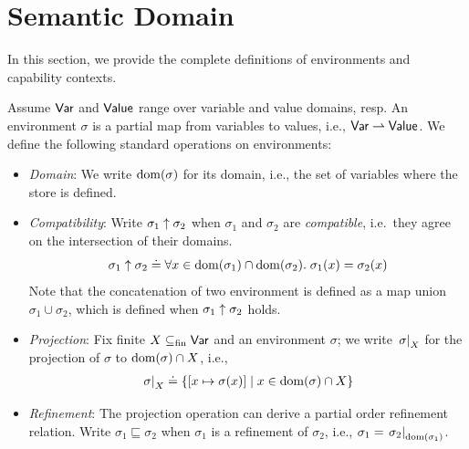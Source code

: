 \newpage
\section{Semantic Domain}%
\label{sec:formalization-details}

In this section, we provide the complete definitions of environments
and capability contexts.

\begin{definition}[Environment]\label{def:env}
  Assume $\mathsf{Var}$ and $\mathsf{Value}$ range over variable and value domains,
  resp. An environment $\sigma$ is a partial map from variables to
  values, i.e., $\mathsf{Var} \rightharpoonup \mathsf{Value}$.
  We define the following standard operations on environments:
\begin{itemize}
 \item \emph{Domain}: We write $\mathrm{dom}(\sigma)$ for its domain, i.e., the set of variables where the store is defined.
  \item \emph{Compatibility}: Write $\sigma_1 \mathrel{\uparrow} \sigma_2$ when $\sigma_1$ and $\sigma_2$ are
    \emph{compatible}, i.e.\ they agree on the intersection of their domains.
    \[
      \sigma_1 \mathrel{\uparrow} \sigma_2
      \doteq
      \forall x \in \mathrm{dom}(\sigma_1) \cap \mathrm{dom}(\sigma_2).\; \sigma_1(x) = \sigma_2(x)
    \]
    Note that the concatenation of two environment is defined as a map
    union $\sigma_1 \cup \sigma_2$, which is defined when
    $\sigma_1 \mathrel{\uparrow} \sigma_2$ holds.
  \item \emph{Projection}: Fix finite $X \subseteq_{\mathrm{fin}}
    \mathsf{Var}$ and an environment $\sigma$; we write $\left.{\sigma}\right|_{X}$ for
    the projection of $\sigma$ to $\mathrm{dom}(\sigma) \cap X$, i.e.,
  \begin{align*}
    \left.{\sigma}\right|_{X} \doteq \{ [x\mapsto \sigma(x)] \mid x \in \mathrm{dom}(\sigma) \cap X \}
  \end{align*}
  \item \emph{Refinement}: The projection operation can derive a
    partial order refinement relation. Write $\sigma_1 \sqsubseteq
    \sigma_2$ when $\sigma_1$ is a refinement of $\sigma_2$, i.e.,
    $\sigma_1 = \left.{\sigma_2}\right|_{\mathrm{dom}(\sigma_1)} $.
\end{itemize}
\end{definition}

